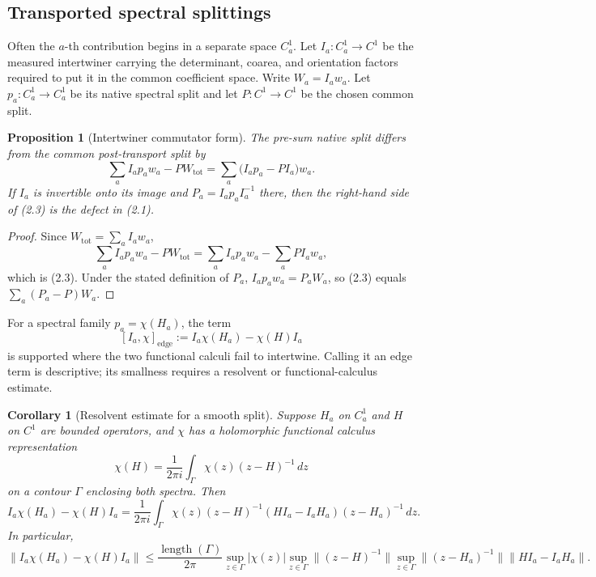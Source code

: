 \documentclass[11pt]{article}
\newtheorem{proposition}[theorem]{Proposition}
\newtheorem{corollary}[theorem]{Corollary}
\begin{document}
\subsection{Transported spectral splittings}

Often the \(a\)-th contribution begins in a separate space
\(C_a^1\).  Let \(I_a:C_a^1\to C^1\) be the measured intertwiner carrying
the determinant, coarea, and orientation factors required to put it in
the common coefficient space.  Write \(W_a=I_aw_a\).  Let
\(p_a:C_a^1\to C_a^1\) be its native spectral split and let
\(P:C^1\to C^1\) be the chosen common split.

\begin{proposition}[Intertwiner commutator form]
\label{prop:v11v2-intertwiner}
The pre-sum native split differs from the common post-transport split by
\[
 \sum_a I_ap_aw_a-PW_{\mathrm{tot}}
 =
 \sum_a\bigl(I_ap_a-PI_a\bigr)w_a.
 \tag{2.3}
\]
If \(I_a\) is invertible onto its image and
\(P_a=I_ap_aI_a^{-1}\) there, then the right-hand side of (2.3) is the
defect in (2.1).
\end{proposition}

\begin{proof}
Since \(W_{\mathrm{tot}}=\sum_aI_aw_a\),
\[
 \sum_a I_ap_aw_a-PW_{\mathrm{tot}}
 =
 \sum_a I_ap_aw_a-\sum_aPI_aw_a,
\]
which is (2.3).  Under the stated definition of \(P_a\),
\(I_ap_aw_a=P_aW_a\), so (2.3) equals
\(\sum_a(P_a-P)W_a\).
\end{proof}

For a spectral family \(p_a=\chi(H_a)\), the term
\[
 [I_a,\chi]_{\mathrm{edge}}
 :=
 I_a\chi(H_a)-\chi(H)I_a
\]
is supported where the two functional calculi fail to intertwine.  Calling
it an edge term is descriptive; its smallness requires a resolvent or
functional-calculus estimate.

\begin{corollary}[Resolvent estimate for a smooth split]
\label{cor:v11v2-resolvent}
Suppose \(H_a\) on \(C_a^1\) and \(H\) on \(C^1\) are bounded operators,
and \(\chi\) has a holomorphic functional calculus representation
\[
 \chi(H)=\frac{1}{2\pi i}\int_\Gamma
 \chi(z)(z-H)^{-1}\,dz
\]
on a contour \(\Gamma\) enclosing both spectra.  Then
\[
 I_a\chi(H_a)-\chi(H)I_a
 =
 \frac{1}{2\pi i}\int_\Gamma
 \chi(z)(z-H)^{-1}(HI_a-I_aH_a)(z-H_a)^{-1}\,dz.
 \tag{2.4}
\]
In particular,
\[
 \|I_a\chi(H_a)-\chi(H)I_a\|
 \leq
 \frac{\operatorname{length}(\Gamma)}{2\pi}
 \sup_{z\in\Gamma}|\chi(z)|
 \sup_{z\in\Gamma}\|(z-H)^{-1}\|
 \sup_{z\in\Gamma}\|(z-H_a)^{-1}\|
 \|HI_a-I_aH_a\|.
 \tag{2.5}
\]
\end{corollary}
\end{document}
